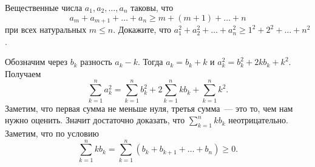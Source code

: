 Вещественные числа $a_1, a_2, \ldots, a_n$ таковы, что
\[
    a_m + a_{m + 1} + \ldots + a_n
\geq
    m + (m + 1) + \ldots + n
\]
при всех натуральных $m \leq n$.
Докажите, что $a_1^2 + a_2^2 + \ldots + a_n^2 \geq 1^2 + 2^2 + \ldots + n^2$.

\solution
Обозначим через $b_k$ разность $a_k - k$.
Тогда $a_k = b_k + k$ и $a_k^2 = b_k^2 + 2 k b_k + k^2$.
Получаем
\[
    \sum_{k = 1}^{n}
        a_k^2
=
    \sum_{k = 1}^n
        b_k^2
    +
    2 \sum_{k = 1}^{n}
        k b_k
    +
    \sum_{k = 1}^n
        k^2
.\]
Заметим, что первая сумма не меньше нуля, третья сумма~--- это то, чем нам
нужно оценить.
Значит достаточно доказать, что $\sum_{k = 1}^{n} k b_k$ неотрицательно.
Заметим, что по условию
\[
    \sum_{k = 1}^{n}
        k b_k
=
    \sum_{k = 1}^{n}
        (b_k + b_{k+1} + \ldots + b_n)
\geq
    0
.\]

